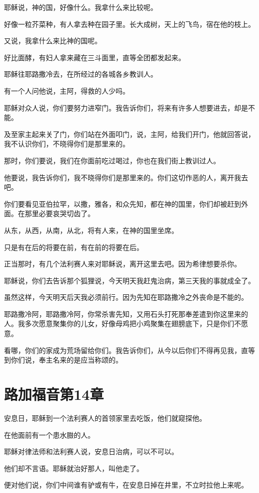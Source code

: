\documentclass[12pt,oneside]{book}
\begin{document}
耶稣说，神的国，好像什么。我拿什么来比较呢。

好像一粒芥菜种，有人拿去种在园子里。长大成树，天上的飞鸟，宿在他的枝上。

又说，我拿什么来比神的国呢。

好比面酵，有妇人拿来藏在三斗面里，直等全团都发起来。

耶稣往耶路撒冷去，在所经过的各城各乡教训人。

有一个人问他说，主阿，得救的人少吗。

耶稣对众人说，你们要努力进窄门。我告诉你们，将来有许多人想要进去，却是不能。

及至家主起来关了门，你们站在外面叩门，说，主阿，给我们开门，他就回答说，我不认识你们，不晓得你们是那里来的。

那时，你们要说，我们在你面前吃过喝过，你也在我们街上教训过人。

他要说，我告诉你们，我不晓得你们是那里来的。你们这切作恶的人，离开我去吧。

你们要看见亚伯拉罕，以撒，雅各，和众先知，都在神的国里，你们却被赶到外面。在那里必要哀哭切齿了。

从东，从西，从南，从北，将有人来，在神的国里坐席。

只是有在后的将要在前，有在前的将要在后。

正当那时，有几个法利赛人来对耶稣说，离开这里去吧。因为希律想要杀你。

耶稣说，你们去告诉那个狐狸说，今天明天我赶鬼治病，第三天我的事就成全了。

虽然这样，今天明天后天我必须前行。因为先知在耶路撒冷之外丧命是不能的。

耶路撒冷阿，耶路撒冷阿，你常杀害先知，又用石头打死那奉差遣到你这里来的人。我多次愿意聚集你的儿女，好像母鸡把小鸡聚集在翅膀底下，只是你们不愿意。

看哪，你们的家成为荒场留给你们。我告诉你们，从今以后你们不得再见我，直等到你们说，奉主名来的是应当称颂的。

\chapter{路加福音第14章}
安息日，耶稣到一个法利赛人的首领家里去吃饭，他们就窥探他。

在他面前有一个患水臌的人。

耶稣对律法师和法利赛人说，安息日治病，可以不可以。

他们却不言语。耶稣就治好那人，叫他走了。

便对他们说，你们中间谁有驴或有牛，在安息日掉在井里，不立时拉他上来呢。
\end{document}
